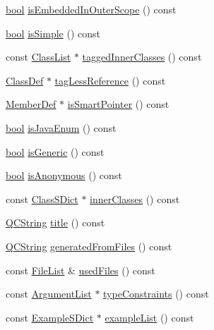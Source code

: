 \begin{DoxyCompactItemize}
\item 
\hyperlink{qglobal_8h_a1062901a7428fdd9c7f180f5e01ea056}{bool} \hyperlink{class_class_def_a79756e364807facfab942f5904a08b22}{is\+Embedded\+In\+Outer\+Scope} () const 
\item 
\hyperlink{qglobal_8h_a1062901a7428fdd9c7f180f5e01ea056}{bool} \hyperlink{class_class_def_a3c03de74d7855a0ae434708ffd32ebb2}{is\+Simple} () const 
\item 
const \hyperlink{class_class_list}{Class\+List} $\ast$ \hyperlink{class_class_def_aba3a989785aeca76148a80a2cbdd790e}{tagged\+Inner\+Classes} () const 
\item 
\hyperlink{class_class_def}{Class\+Def} $\ast$ \hyperlink{class_class_def_aedb3a108f7350389fc2617c91f35c6a8}{tag\+Less\+Reference} () const 
\item 
\hyperlink{class_member_def}{Member\+Def} $\ast$ \hyperlink{class_class_def_a67fb720efa191c570533f6f560eefb8e}{is\+Smart\+Pointer} () const 
\item 
\hyperlink{qglobal_8h_a1062901a7428fdd9c7f180f5e01ea056}{bool} \hyperlink{class_class_def_a226b9f0361f9981e18a7d79fd854bdc0}{is\+Java\+Enum} () const 
\item 
\hyperlink{qglobal_8h_a1062901a7428fdd9c7f180f5e01ea056}{bool} \hyperlink{class_class_def_a1ad390d4be277180106ccc33d752670b}{is\+Generic} () const 
\item 
\hyperlink{qglobal_8h_a1062901a7428fdd9c7f180f5e01ea056}{bool} \hyperlink{class_class_def_a5c8e8aaeb231633d3a70729bad788b26}{is\+Anonymous} () const 
\item 
const \hyperlink{class_class_s_dict}{Class\+S\+Dict} $\ast$ \hyperlink{class_class_def_a28d78ef43350aad6cba1b438c4188243}{inner\+Classes} () const 
\item 
\hyperlink{class_q_c_string}{Q\+C\+String} \hyperlink{class_class_def_a3ed4210d2331dd4f8e02b81aa3aa1537}{title} () const 
\item 
\hyperlink{class_q_c_string}{Q\+C\+String} \hyperlink{class_class_def_ab6101950b5b6cdbb16d7c99fb9b14e44}{generated\+From\+Files} () const 
\item 
const \hyperlink{class_file_list}{File\+List} \& \hyperlink{class_class_def_a87466e5ba482ae0f7e880602713cc94b}{used\+Files} () const 
\item 
const \hyperlink{class_argument_list}{Argument\+List} $\ast$ \hyperlink{class_class_def_ad5267bcd465cfc6417eae9dfeeecf61a}{type\+Constraints} () const 
\item 
const \hyperlink{class_example_s_dict}{Example\+S\+Dict} $\ast$ \hyperlink{class_class_def_a43fba0c74d9930fb01e07d2a28fa39bb}{example\+List} () const 

\end{DoxyCompactItemize}
